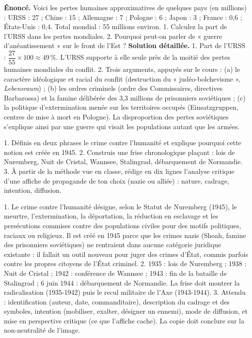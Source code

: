 \documentclass[11pt]{article}
\begin{document}
\begin{exoresolu}
\textbf{Énoncé.} Voici les pertes humaines approximatives de quelques pays (en millions) : URSS : 27 ; Chine : 15 ; Allemagne : 7 ; Pologne : 6 ; Japon : 3 ; France : 0,6 ; États-Unis : 0,4. Total mondial : 55 millions environ.
1. Calculez la part de l'URSS dans les pertes mondiales.
2. Pourquoi peut-on parler de « guerre d'anéantissement » sur le front de l'Est ?
\tcblower
\textbf{Solution détaillée.}
1. Part de l'URSS : $\dfrac{27}{55} \times 100 \approx 49\,\%$. L'URSS supporte à elle seule près de la moitié des pertes humaines mondiales du conflit.
2. Trois arguments, appuyés sur le cours : (a) le caractère idéologique et racial du conflit (destruction du « judéo-bolchevisme », \emph{Lebensraum}) ; (b) les ordres criminels (ordre des Commissaires, directives Barbarossa) et la famine délibérée des 3,3 millions de prisonniers soviétiques ; (c) la politique d'extermination menée sur les territoires occupés (Einsatzgruppen, centres de mise à mort en Pologne). La disproportion des pertes soviétiques s'explique ainsi par une guerre qui visait les populations autant que les armées.
\end{exoresolu}

\begin{exercice}
1. Définis en deux phrases le crime contre l'humanité et explique pourquoi cette notion est créée en 1945.
2. Construis une frise chronologique plaçant : lois de Nuremberg, Nuit de Cristal, Wannsee, Stalingrad, débarquement de Normandie.
3. À partir de la méthode vue en classe, rédige en dix lignes l'analyse critique d'une affiche de propagande de ton choix (nazie ou alliée) : nature, cadrage, intention, diffusion.
\end{exercice}

\begin{corrige}[Exercice]
1. Le crime contre l'humanité désigne, selon le Statut de Nuremberg (1945), le meurtre, l'extermination, la déportation, la réduction en esclavage et les persécutions commises contre des populations civiles pour des motifs politiques, raciaux ou religieux. Il est créé en 1945 parce que les crimes nazis (Shoah, famine des prisonniers soviétiques) ne rentraient dans aucune catégorie juridique existante : il fallait un outil nouveau pour juger des crimes d'État, commis parfois contre les propres citoyens de l'État criminel.
2. 1935 : lois de Nuremberg ; 1938 : Nuit de Cristal ; 1942 : conférence de Wannsee ; 1943 : fin de la bataille de Stalingrad ; 6 juin 1944 : débarquement de Normandie. La frise doit montrer la radicalisation (1935-1942) puis le recul militaire de l'Axe (1943-1944).
3. Attendu : identification (auteur, date, commanditaire), description du cadrage et des symboles, intention (mobiliser, exalter, désigner un ennemi), mode de diffusion, et mise en perspective critique (ce que l'affiche cache). La copie doit conclure sur la non-neutralité de l'image.
\end{corrige}
\end{document}
